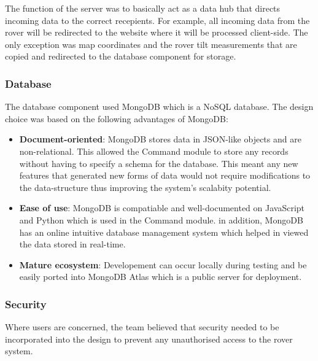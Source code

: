\documentclass[11pt, a4paper]{article}
\begin{document}
The function of the server was to basically act as a data hub that directs incoming data to the correct recepients. For example, all incoming data from the rover will be redirected to the website where it will be processed client-side. The only exception was map coordinates and the rover tilt measurements that are copied and redirected to the database component for storage.

\pagebreak
\subsubsection{Database}

The database component used MongoDB which is a NoSQL database. The design choice was based on the following advantages of MongoDB:
\begin{itemize}
    \item \textbf{Document-oriented}: MongoDB stores data in JSON-like objects and are non-relational. This allowed the Command module to store any records without having to specify a schema for the database. This meant any new features that generated new forms of data would not require modifications to the data-structure thus improving the system's scalabity potential.
    
    \item \textbf{Ease of use}: MongoDB is compatiable and well-documented on JavaScript and Python which is used in the Command module. in addition, MongoDB has an online intuitive database management system which helped in viewed the data stored in real-time.  
    
    \item \textbf{Mature ecosystem}: Developement can occur locally during testing and be easily ported into MongoDB Atlas which is a public server for deployment.
\end{itemize}

\subsubsection{Security}

Where users are concerned, the team believed that security needed to be incorporated into the design to prevent any unauthorised access to the rover system.
\end{document}
